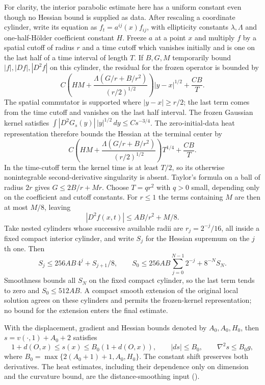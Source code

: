 For clarity, the interior parabolic estimate here has a uniform
constant even though no Hessian bound is supplied as data.  After
rescaling a coordinate cylinder, write its equation as
$f_t=a^{ij}(x)f_{ij}$, with ellipticity constants $\lambda,\Lambda$
and one-half-H\"older coefficient constant $H$.
Freeze $a$ at a point $x$ and multiply $f$ by a spatial cutoff of
radius $r$ and a time cutoff which vanishes initially and is one
on the last half of a time interval of length $T$.
If $B,G,M$ temporarily bound $|f|,|Df|,|D^2f|$ on this cylinder,
the residual for the frozen operator is bounded by
\[
 C\left(HM+
       \frac{\Lambda(G/r+B/r^2)}{(r/2)^{1/2}}\right)|y-x|^{1/2}
                   +\frac{C B}{T}.
\]
The spatial commutator is supported where $|y-x|\geq r/2$;
the last term comes from the time cutoff and vanishes on the last
half interval.  The frozen Gaussian kernel satisfies
$\int|D^2G_s(y)|\,|y|^{1/2}\,dy\leq C s^{-3/4}$.
The zero-initial-data heat representation therefore bounds the
Hessian at the terminal center by
\[
 C\left(HM+
       \frac{\Lambda(G/r+B/r^2)}{(r/2)^{1/2}}\right)T^{1/4}
                   +\frac{CB}{T}.
\]
In the time-cutoff term the kernel time is at least $T/2$, so
its otherwise nonintegrable second-derivative singularity is absent.
Taylor's formula on a ball of radius $2r$ gives
$G\leq2B/r+Mr$.  Choose $T=qr^2$ with $q>0$ small, depending
only on the coefficient and cutoff constants.  For $r\leq1$ the
terms containing $M$ are then at most $M/8$, leaving
\[
 |D^2f(x,t)|\leq A B/r^2+M/8.
\]
Take nested cylinders whose successive available radii are
$r_j=2^{-j}/16$, all inside a fixed compact interior cylinder, and
write $S_j$ for the Hessian supremum on the $j$th one.  Then
\[
 S_j\leq256AB\,4^j+S_{j+1}/8,
 \qquad
 S_0\leq256AB\sum_{j=0}^{N-1}2^{-j}+8^{-N}S_N.
\]
Smoothness bounds all $S_N$ on the fixed compact cylinder, so the
last term tends to zero and $S_0\leq512AB$.  A compact smooth
extension of the original local solution agrees on these cylinders
and permits the frozen-kernel representation; no bound for the
extension enters the final estimate.

With the displacement, gradient and Hessian bounds denoted by
$A_0,A_0,H_0$,
then $s=v(\cdot,1)+A_0+2$ satisfies
\[
 1+d(O,x)\leq s(x)\leq B_0(1+d(O,x)),\qquad
 |ds|\leq B_0,\qquad \nabla^2s\leq B_0g,
\]
where $B_0=\max\{2(A_0+1)+1,A_0,H_0\}$.
The constant shift preserves both derivatives.  The heat estimates,
including their dependence only on dimension and the curvature bound,
are the distance-smoothing input
(\cite[Proposition 26.49, equations (26.128)--(26.152),
pp.~378--385]{ChowEtAl2010}).

